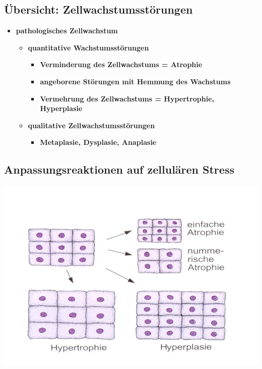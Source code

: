 \subsection{Übersicht: Zellwachstumsstörungen}
	\begin{itemize}
		\item \textbf{pathologisches Zellwachstum}
			\begin{itemize}
				\item \textbf{quantitative Wachstumsstörungen}
					\begin{itemize}
						\item \textbf{Verminderung des Zellwachstums = Atrophie}
						\item \textbf{angeborene Störungen mit Hemmung des Wachstums}
						\item \textbf{Vermehrung des Zellwachstums = Hypertrophie, Hyperplasie}
					\end{itemize}
				\item \textbf{qualitative Zellwachstumsstörungen}
					\begin{itemize}
						\item \textbf{Metaplasie, Dysplasie, Anaplasie}
					\end{itemize}
			\end{itemize}
	\end{itemize}

\subsection{Anpassungsreaktionen auf zellulären Stress}
	\begin{center}
		\includegraphics[scale=0.5]{Picture1.jpg}
	\end{center}


